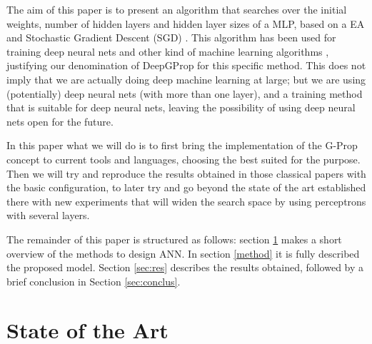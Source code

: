 \documentclass[runningheads]{llncs}
\begin{document}
The aim of this paper is to present an algorithm that searches over the initial weights, number of
hidden layers and hidden layer sizes of a MLP, based on a EA and
Stochastic Gradient Descent (SGD) \cite{bottou2012stochastic}. This
algorithm has been used for training deep neural nets and other kind
of machine learning algorithms
\cite{bottou2012stochastic,bottou2010large}, justifying our
denomination of DeepGProp for this specific method. 
This does not imply that we are actually doing deep machine learning at large; but
we are using (potentially) deep neural nets (with more than one
layer), and a training method that is suitable for deep neural nets,
leaving the possibility of using deep neural nets open for the future.



In this paper what we will do is to first bring the implementation of
the G-Prop concept to current tools and languages, choosing the best
suited for the purpose. Then we will try and reproduce the results
obtained in those classical papers with the basic configuration, to
later try and go beyond the state of the art established there with
new experiments that will widen the search space by using perceptrons
with several layers.

The remainder of this paper is structured as follows:
section \ref{soa} makes a short overview of the methods to design ANN.
In section \ref{method} it is fully described the proposed model.
Section \ref{sec:res} describes the results obtained,
followed by a brief conclusion in Section \ref{sec:conclus}.

\section{State of the Art}
\label{soa}
\end{document}
